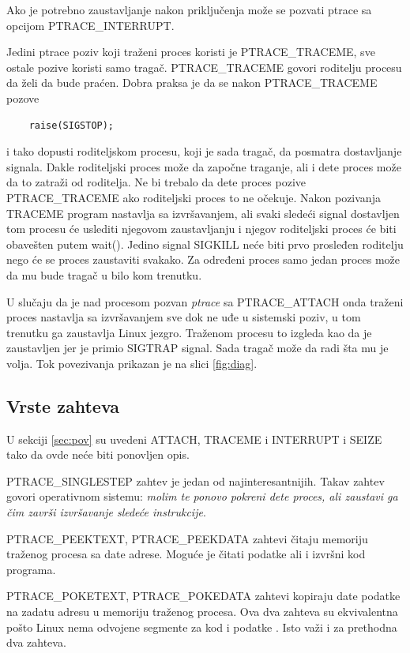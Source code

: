 \documentclass[a4paper]{article}
\begin{document}
Ako je potrebno zaustavljanje nakon priključenja može se pozvati ptrace sa opcijom PTRACE\_INTERRUPT.

Jedini ptrace poziv koji traženi proces koristi je PTRACE\_TRACEME, sve ostale pozive koristi samo tragač.
PTRACE\_TRACEME govori roditelju procesu da želi da bude praćen. 
Dobra praksa je da se nakon PTRACE\_TRACEME pozove 

\begin{verbatim}
    raise(SIGSTOP);
\end{verbatim}
i tako dopusti roditeljskom procesu, koji je sada tragač, da posmatra dostavljanje signala.
Dakle roditeljski proces može da započne traganje, ali i dete proces može da to zatraži od roditelja.
Ne bi trebalo da dete proces pozive PTRACE\_TRACEME ako roditeljski proces to ne očekuje. 
Nakon pozivanja TRACEME program nastavlja sa izvršavanjem, ali svaki sledeći signal dostavljen tom procesu
će uslediti njegovom zaustavljanju i njegov roditeljski proces će biti obavešten putem wait(). 
Jedino signal SIGKILL neće biti prvo prosleđen roditelju nego će se proces zaustaviti svakako.
Za određeni proces samo jedan proces može da mu bude tragač u bilo kom trenutku.

U slučaju da je nad procesom pozvan \emph{ptrace} sa PTRACE\_ATTACH onda traženi proces nastavlja sa izvršavanjem sve dok ne
uđe u sistemski poziv, u tom trenutku ga zaustavlja Linux jezgro. Traženom procesu to izgleda kao da je zaustavljen
jer je primio SIGTRAP signal. Sada tragač može da radi šta mu je volja. Tok povezivanja prikazan je na slici \ref{fig:diag}.

\subsection{Vrste zahteva}	
U sekciji \ref{sec:pov} su uvedeni 
ATTACH, TRACEME i INTERRUPT i SEIZE tako da ovde neće biti ponovljen opis.

PTRACE\_SINGLESTEP
    zahtev je jedan od najinteresantnijih. Takav zahtev govori operativnom sistemu: \emph{molim te ponovo pokreni
    dete proces, ali zaustavi ga čim završi izvršavanje sledeće instrukcije}.

PTRACE\_PEEKTEXT, PTRACE\_PEEKDATA
    zahtevi čitaju memoriju traženog procesa sa date adrese. Moguće je čitati podatke ali i izvršni kod programa.

PTRACE\_POKETEXT, PTRACE\_POKEDATA
    zahtevi kopiraju date podatke na zadatu adresu u memoriju traženog procesa.
    Ova dva zahteva su ekvivalentna pošto Linux nema odvojene segmente za kod i podatke \cite{man}. 
    Isto važi i za prethodna dva zahteva.
\end{document}
